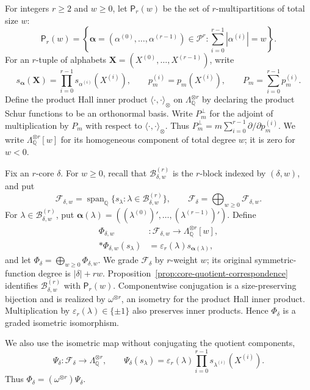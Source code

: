 \documentclass[12pt,reqno,a4paper]{amsart}
\numberwithin{equation}{section}
\numberwithin{figure}{section}
\theoremstyle{plain}
\theoremstyle{definition}
\newcommand{\eps}{\varepsilon}
\begin{document}
For integers $r\geq2$ and $w\geq0$, let $\mathsf P_r(w)$ be the set
of $r$-multipartitions of total size $w$:
\[
 \mathsf P_r(w)
 =\left\{
 \boldsymbol\alpha=(\alpha^{(0)},\ldots,\alpha^{(r-1)})
 \in\mathscr P^r:
 \sum_{i=0}^{r-1}|\alpha^{(i)}|=w
 \right\}.
\]
For an $r$-tuple of alphabets
$\mathbf X=(X^{(0)},\ldots,X^{(r-1)})$, write
\[
 s_{\boldsymbol\alpha}(\mathbf X)
 =\prod_{i=0}^{r-1}s_{\alpha^{(i)}}(X^{(i)}),
 \qquad
 p_m^{(i)}=p_m(X^{(i)}),
 \qquad
 P_m=\sum_{i=0}^{r-1}p_m^{(i)}.
\]
Define the product Hall inner product
$\langle\cdot,\cdot\rangle_{\otimes}$ on
$\Lambda_{\mathbb Q}^{\otimes r}$ by declaring the product Schur
functions to be an orthonormal basis.
Write $P_m^{\perp}$ for the adjoint of multiplication by $P_m$
with respect to $\langle\cdot,\cdot\rangle_{\otimes}$.
Thus $P_m^{\perp}=m\sum_{i=0}^{r-1}\partial/\partial p_m^{(i)}$.
We write $\Lambda_{\mathbb Q}^{\otimes r}[w]$ for its homogeneous
component of total degree $w$; it is zero for $w<0$.

Fix an $r$-core $\delta$.  For $w\geq0$, recall that
$\mathcal B_{\delta,w}^{(r)}$ is the $r$-block indexed by $(\delta,w)$, and put
\[
\mathcal F_{\delta,w}
=\operatorname{span}_{\mathbb Q}
  \{s_\lambda:\lambda\in\mathcal B_{\delta,w}^{(r)}\},
\qquad
\mathcal F_\delta=\bigoplus_{w\geq0}\mathcal F_{\delta,w}.
\]
For $\lambda\in\mathcal B_{\delta,w}^{(r)}$, put
$\boldsymbol\alpha(\lambda)=((\lambda^{(0)})',\ldots,
(\lambda^{(r-1)})')$.  Define
\begin{align}
 \Phi_{\delta,w}&:\mathcal F_{\delta,w}
 \longrightarrow\Lambda_{\mathbb Q}^{\otimes r}[w],
 \label{eq:signed-quotient-coordinate-map}\\*
 \Phi_{\delta,w}(s_\lambda)
 &=\eps_r(\lambda)s_{\boldsymbol\alpha(\lambda)},
 \label{eq:signed-quotient-coordinate-basis}
\end{align}
and let $\Phi_\delta=\bigoplus_{w\geq0}\Phi_{\delta,w}$.
We grade $\mathcal F_\delta$ by $r$-weight $w$; its original
symmetric-function degree is $|\delta|+rw$.
Proposition~\ref{prop:core-quotient-correspondence} identifies
$\mathcal B_{\delta,w}^{(r)}$ with $\mathsf P_r(w)$.  Componentwise conjugation is a size-preserving bijection
and is realized by $\omega^{\otimes r}$, an isometry for the product
Hall inner product.  Multiplication by $\eps_r(\lambda)\in\{\pm1\}$
also preserves inner products.  Hence
$\Phi_\delta$ is a graded isometric isomorphism.

We also use the isometric map without conjugating the quotient
components,
\begin{equation}\label{eq:untransposed-quotient-map}
 \Psi_\delta:\mathcal F_\delta\longrightarrow\Lambda_{\mathbb Q}^{\otimes r},
 \qquad
 \Psi_\delta(s_\lambda)
 =\eps_r(\lambda)\prod_{i=0}^{r-1}s_{\lambda^{(i)}}(X^{(i)}).
\end{equation}
Thus $\Phi_\delta=(\omega^{\otimes r})\Psi_\delta$.
\end{document}
